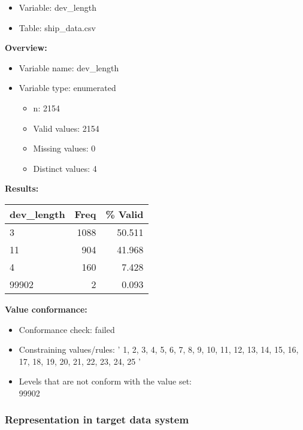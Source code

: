 \documentclass[
]{article}
\providecommand{\tightlist}{%
  \setlength{\itemsep}{0pt}\setlength{\parskip}{0pt}}
\begin{document}
\begin{itemize}
\tightlist
\item
  Variable: dev\_length
\item
  Table: ship\_data.csv
\end{itemize}

\textbf{Overview:}

\begin{itemize}
\tightlist
\item
  Variable name: dev\_length
\item
  Variable type: enumerated

  \begin{itemize}
  \tightlist
  \item
    n: 2154
  \item
    Valid values: 2154
  \item
    Missing values: 0
  \item
    Distinct values: 4
  \end{itemize}
\end{itemize}

\textbf{Results:}\\

\begin{table}[H]
\centering
\begin{tabular}{l|r|r}
\hline
\textbf{dev\_length} & \textbf{Freq} & \textbf{\% Valid}\\
\hline
3 & 1088 & 50.511\\
\hline
11 & 904 & 41.968\\
\hline
4 & 160 & 7.428\\
\hline
99902 & 2 & 0.093\\
\hline
\end{tabular}
\end{table}

\textbf{Value conformance:}

\begin{itemize}
\tightlist
\item
  Conformance check: failed
\item
  Constraining values/rules: ' 1, 2, 3, 4, 5, 6, 7, 8, 9, 10, 11, 12,
  13, 14, 15, 16, 17, 18, 19, 20, 21, 22, 23, 24, 25 '
\item
  Levels that are not conform with the value set:\\
  99902
\end{itemize}

\newpage

\hypertarget{representation-in-target-data-system-6}{%
\subsubsection{\texorpdfstring{Representation in \textbf{target} data
system}{Representation in target data system}}\label{representation-in-target-data-system-6}}
\end{document}
